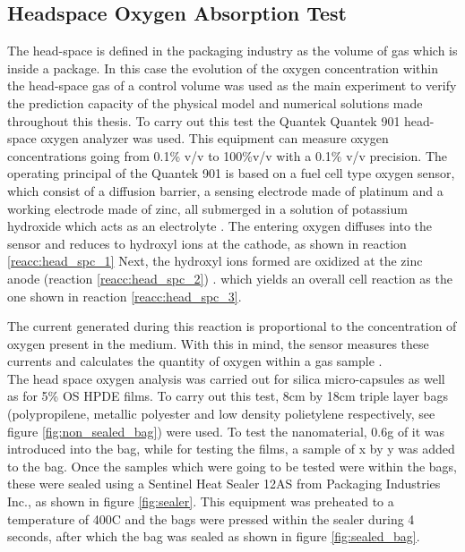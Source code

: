 \begin{refsection}
\subsection{Headspace Oxygen Absorption Test}\label{sec:headspace}
The head-space is defined in the packaging industry as the volume of gas which is inside a package. In this case the evolution of the oxygen concentration within the head-space gas of a control volume was used as the main experiment to verify the prediction capacity of the physical model and numerical solutions made throughout this thesis. To carry out this test the Quantek Quantek 901 head-space oxygen analyzer was used. This equipment can measure oxygen concentrations going from 0.1\% v/v to 100\%v/v with a 0.1\% v/v precision. The operating principal of the Quantek 901 is based on a fuel cell type oxygen sensor, which consist of a diffusion barrier, a sensing electrode made of platinum and a working electrode made of zinc, all submerged in a solution of potassium hydroxide which acts as an electrolyte \cite{Boissevain1996CorporateGuide}. The entering oxygen diffuses into the sensor and reduces to hydroxyl ions at the cathode, as shown in reaction \ref{reacc:head_spc_1}  Next, the hydroxyl ions formed are oxidized at the zinc anode (reaction \ref{reacc:head_spc_2}) .
 which yields an overall cell reaction as the one shown in reaction \ref{reacc:head_spc_3}.

 
 The current generated during this reaction is proportional to the concentration of oxygen present in the medium. With this in mind,  the sensor measures these currents and calculates the quantity of oxygen within a gas sample \cite{GarciaMora2015KineticScavengers, Boissevain1996CorporateGuide}.\\
 
 The head space oxygen analysis was carried out for silica micro-capsules as well as for 5\% OS HPDE films. To carry out this test, 8cm by 18cm triple layer bags (polypropilene, metallic polyester and low density polietylene respectively, see figure \ref{fig:non_sealed_bag}) were used. To test the nanomaterial, 0.6g of it was introduced into the bag, while for testing the films, a sample of x by y was added to the bag. Once the samples which were going to be tested were within the bags, these were sealed using a Sentinel Heat Sealer 12AS from Packaging Industries Inc., as shown in figure \ref{fig:sealer}. This equipment was preheated to a temperature of 400\degree C and the bags  were pressed within the sealer during 4 seconds, after which the bag was sealed as shown in figure \ref{fig:sealed_bag}.  
 

\end{refsection}
